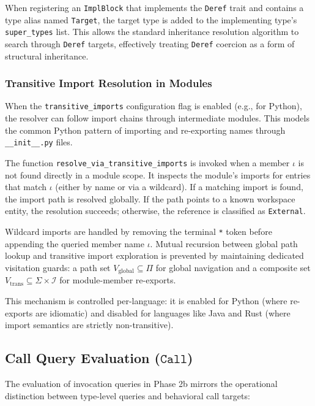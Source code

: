 When registering an \texttt{ImplBlock} that implements the
\texttt{Deref} trait and contains a type alias named \texttt{Target},
the target type is added to the implementing type's
\texttt{super\_types} list. This allows the standard inheritance
resolution algorithm to search through \texttt{Deref} targets,
effectively treating \texttt{Deref} coercion as a form of structural
inheritance.

\subsubsection{Transitive Import Resolution in Modules}
\label{sec:transitive_imports}

When the \texttt{transitive\_imports} configuration flag is enabled
(e.g., for Python), the resolver can follow import chains through
intermediate modules. This models the common Python pattern of
importing and re-exporting names through \texttt{\_\_init\_\_.py} files.

The function \texttt{resolve\_via\_transitive\_imports} is invoked
when a member $\iota$ is not found directly in a module scope. It
inspects the module's imports for entries that match $\iota$ (either by
name or via a wildcard). If a matching import is found, the import
path is resolved globally. If the path points to a known workspace
entity, the resolution succeeds; otherwise, the reference is
classified as \texttt{External}.

Wildcard imports are handled by removing the terminal \texttt{*} token
before appending the queried member name $\iota$. Mutual recursion between
global path lookup and transitive import exploration is prevented by
maintaining dedicated visitation guards: a path set
$V_{\text{global}} \subseteq \Pi$
for global navigation and a composite set $V_{\text{trans}} \subseteq
\Sigma \times \mathcal{I}$
for module-member re-exports.

This mechanism is controlled per-language: it is enabled for Python
(where re-exports are idiomatic) and disabled for languages like Java
and Rust (where import semantics are strictly non-transitive).

\subsection{Call Query Evaluation ($\texttt{Call}$)}
\label{sec:call_query_evaluation}

The evaluation of invocation queries in Phase 2b mirrors the
operational distinction between
type-level queries and behavioral call targets:

